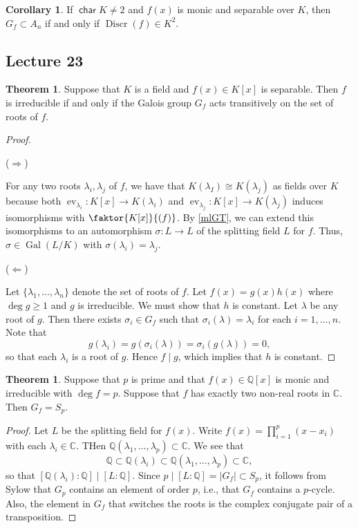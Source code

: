 \documentclass[10pt,letterpaper,cm]{nupset}
\theoremstyle{definition}
\theoremstyle{theorem}
\newtheorem{theorem}[definition]{Theorem}
\newtheorem{corollary}[definition]{Corollary}
\theoremstyle{remark}
\newcommand{\C}{\mathbb C}
\newcommand{\Q}{\mathbb Q}
\newcommand{\1}{\mathbf{1}}
\newcommand{\0}{\vec 0}
\DeclareMathOperator{\Char}{\mathsf{char}}
\DeclareMathOperator{\gal}{Gal}
\DeclareMathOperator{\ev}{ev}
\DeclareMathOperator{\disc}{Discr}
\begin{document}
\begin{corollary}
If $\Char{K} \ne 2$ and $f(x)$ is monic and separable over $K$, then $G_f \subset A_n$ if and only if $\disc(f) \in K^2$. 
\end{corollary}

\subsection{Lecture 23}

\begin{theorem}
Suppose that $K$ is a field and $f(x) \in K[x]$ is separable. Then $f$ is irreducible if and only if the Galois group $G_f$ acts transitively on the set of roots of $f$.  
\end{theorem}
\begin{proof} $ $

 ($\Longrightarrow$) 
 
 For any two roots $\lambda_i, \lambda_j$ of $f$, we have that $K(\lambda_I) \cong K(\lambda_j)$ as fields over $K$ because both $\ev_{\lambda_i} : K[x] \to K(\lambda_i)$ and $\ev_{\lambda_j} : K[x] \to K(\lambda_j)$ induces isomorphisms with $\faktor{K[x]}{(f)}$. By \cref{mlGT}, we can extend this isomorphisms to an automorphism $\sigma : L \to L$ of the splitting field $L$ for $f$. Thus, $\sigma \in \gal(L/K)$ with $\sigma(\lambda_i) = \lambda_j$. 

\medskip


($\Longleftarrow$) 

Let $\{\lambda_1, \ldots, \lambda_n\}$ denote the set of roots of $f$. Let $f(x) = g(x)h(x)$ where $\deg{g} \geq 1$ and $g$ is irreducible. We must show that $h$ is constant. Let $\lambda$ be any root of $g$. Then there exists $\sigma_i \in G_f$ such that $\sigma_i(\lambda) = \lambda_i$ for each $i=1, \ldots, n$. Note that $$g(\lambda_i) = g(\sigma_i(\lambda))= \sigma_i(g(\lambda)) =0,$$ so that each $\lambda_i$ is a root of $g$. Hence $f \mid g$, which implies that $h$ is constant. 
\end{proof}

\begin{theorem}
Suppose that $p$ is prime and that $f(x) \in \Q[x]$ is monic and irreducible with $\deg{f} =p$. Suppose that $f$ has exactly two non-real roots in $\C$. Then $G_f = S_p$.
\end{theorem}
\begin{proof}
Let $L$ be the splitting field for $f(x)$. Write $f(x) = \prod_{i=1}^p(x- x_i)$ with each $\lambda_i \in \C$. THen $\Q(\lambda_1, \ldots, \lambda_p) \subset \C$. We see that $$ \Q \subset \Q(\lambda_i)  \subset \Q(\lambda_1, \ldots, \lambda_p) \subset \C,$$ so that $[\Q(\lambda_i) : \Q] \mid [L : \Q]$.  Since $p \mid [L: \Q] = \left\lvert{G_f}\right\rvert \subset S_p$, it follows from Sylow that $G_p$ contains an element of order $p$, i.e., that $G_f$ contains a $p$-cycle. Also, the element in $G_f$ that switches the roots is the complex conjugate pair of a transposition.
\end{proof}
\end{document}
